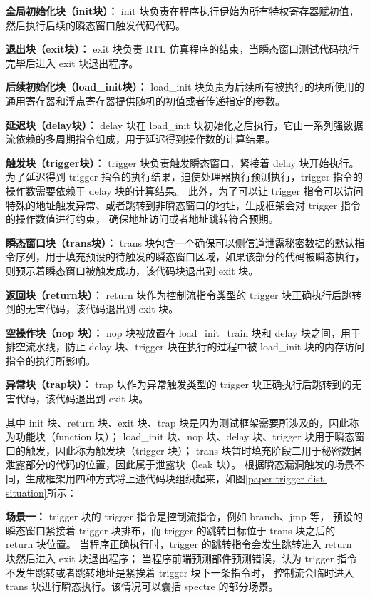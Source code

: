 \textbf{全局初始化块（init块）：}
init 块负责在程序执行伊始为所有特权寄存器赋初值，然后执行后续的瞬态窗口触发代码代码。\par
\textbf{退出块（exit块）：}
exit 块负责 RTL 仿真程序的结束，当瞬态窗口测试代码执行完毕后进入 exit 块退出程序。\par
\textbf{后续初始化块（load\_init块）：}
load\_init 块负责为后续所有被执行的块所使用的通用寄存器和浮点寄存器提供随机的初值或者传递指定的参数。\par
\textbf{延迟块（delay块）：}
delay 块在 load\_init 块初始化之后执行，它由一系列强数据流依赖的多周期指令组成，用于延迟得到操作数的计算结果。\par
\textbf{触发块（trigger块）：}
trigger 块负责触发瞬态窗口，紧接着 delay 块开始执行。为了延迟得到 trigger 指令的执行结果，迫使处理器执行预测执行，trigger 指令的操作数需要依赖于 delay 块的计算结果。
此外，为了可以让 trigger 指令可以访问特殊的地址触发异常、或者跳转到非瞬态窗口的地址，生成框架会对 trigger 指令的操作数值进行约束，
确保地址访问或者地址跳转符合预期。\par
\textbf{瞬态窗口块（trans块）：}
trans 块包含一个确保可以侧信道泄露秘密数据的默认指令序列，用于填充预设的待触发的瞬态窗口区域，如果该部分的代码被瞬态执行，则预示着瞬态窗口被触发成功，该代码块退出到 exit 块。\par
\textbf{返回块（return块）：}
return 块作为控制流指令类型的 trigger 块正确执行后跳转到的无害代码，该代码退出到 exit 块。\par
\textbf{空操作块（nop 块）：}
nop 块被放置在 load\_init\_train 块和 delay 块之间，用于排空流水线，防止 delay 块、trigger 块在执行的过程中被 load\_init 块的内存访问指令的执行所影响。\par
\textbf{异常块（trap块）：}
trap 块作为异常触发类型的 trigger 块正确执行后跳转到的无害代码，该代码退出到 exit 块。\par

其中 init 块、return 块、exit 块、trap 块是因为测试框架需要所涉及的，因此称为功能块（function 块）；
load\_init 块、nop 块、delay 块、trigger 块用于瞬态窗口的触发，因此称为触发块（trigger 块）；
trans 块暂时填充阶段二用于秘密数据泄露部分的代码的位置，因此属于泄露块（leak 块）。
根据瞬态漏洞触发的场景不同，生成框架用四种方式将上述代码块组织起来，如图\ref{paper:trigger-dist-situation}所示：\par

\textbf{场景一：} trigger 块的 trigger 指令是控制流指令，例如 branch、jmp 等，
预设的瞬态窗口紧接着 trigger 块排布，而 trigger 的跳转目标位于 trans 块之后的 return 块位置。
当程序正确执行时，trigger 的跳转指令会发生跳转进入 return 块然后进入 exit 块退出程序；
当程序前端预测部件预测错误，认为 trigger 指令不发生跳转或者跳转地址是紧挨着 trigger 块下一条指令时，
控制流会临时进入 trans 块进行瞬态执行。该情况可以囊括 spectre 的部分场景。\par

